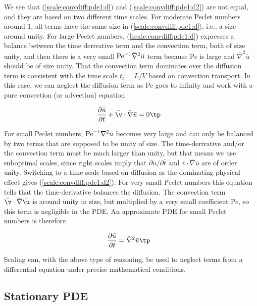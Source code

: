 \documentclass[graybox,envcountchap,sectrefs,final]{svmonodo}
\newenvironment{notice_mdfboxadmon}[1][]{
\begin{notice_mdfboxmdframed}[frametitle=#1]
}
{
\end{notice_mdfboxmdframed}
}
\begin{document}
\begin{notice_mdfboxadmon}
We see that (\ref{scale:convdiff:pde1:d}) and (\ref{scale:convdiff:pde1:d2})
are not equal, and they are based on two different time scales.
For moderate Peclet numbers around 1, all terms have the same size
in (\ref{scale:convdiff:pde1:d}), i.e., a size around unity.
For large Peclet numbers,
(\ref{scale:convdiff:pde1:d}) expresses a balance
between the time derivative term and the convection term, both of size
unity, and then there is a very small
$\hbox{Pe}^{-1}\bar\nabla^2\bar u$ term because Pe is large and
$\bar\nabla^2\bar u$ should be of size unity.
That the convection term dominates over the diffusion term is
consistent with the time scale $t_c=L/V$ based on convection transport.
In this case, we can neglect the diffusion term as Pe goes to infinity
and work with a pure convection (or advection) equation

\[
\frac{\partial \bar u}{\partial \bar t} +
\bar\v\cdot\bar\nabla\bar u = 0\tp
\]

For small Peclet numbers, $\hbox{Pe}^{-1}\bar\nabla^2\bar u$ becomes
very large and can only be balanced by two terms that are supposed to
be unity of size.  The time-derivative and/or the convection term must
be much larger than unity, but that means we use suboptimal scales,
since right scales imply that $\partial\bar u/\partial\bar t$ and
$\bar v\cdot\bar\nabla\bar u$ are of order unity. Switching to a time
scale based on diffusion as the dominating physical effect gives
(\ref{scale:convdiff:pde1:d2}).  For very small Peclet numbers this
equation tells that the time-derivative balances the diffusion.
The convection term $\bar\v\cdot\bar\nabla\bar\u$ is around
unity in size, but multiplied by a very small coefficient Pe, so this term is
negligible in the PDE. An approximate PDE for small Peclet numbers is
therefore

\[
\frac{\partial \bar u}{\partial \bar t}
= \bar\nabla^2\bar u\tp
\]

Scaling can, with the above type of reasoning, be used
to neglect terms from a differential equation under precise mathematical
conditions.
\end{notice_mdfboxadmon}



\subsection{Stationary PDE}
\end{document}
